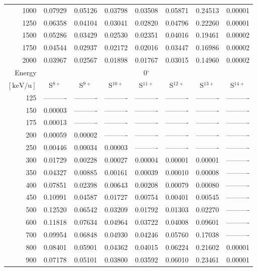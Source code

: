 \begin{table}[ht]
\begin{tabular}{r|c|c|c|c|c|c|c}
     1000 & 0.07929 & 0.05126 & 0.03798 & 0.03508 & 0.05871 & 0.24513 & 0.00001 \\
     1250 & 0.06358 & 0.04104 & 0.03041 & 0.02820 & 0.04796 & 0.22260 & 0.00001 \\
     1500 & 0.05286 & 0.03429 & 0.02530 & 0.02351 & 0.04016 & 0.19461 & 0.00002 \\
     1750 & 0.04544 & 0.02937 & 0.02172 & 0.02016 & 0.03447 & 0.16986 & 0.00002 \\
     2000 & 0.03967 & 0.02567 & 0.01898 & 0.01767 & 0.03015 & 0.14960 & 0.00002 \\ \cline{1-8}
    Energy & \multicolumn{7}{c}{0$^\circ$} \\ \cline{2-8}
    $\mathrm{[keV/u]}$ & S$^{8+}$ & S$^{9+}$ & S$^{10+}$ & S$^{11+}$ & S$^{12+}$ & S$^{13+}$ & S$^{14+}$ \\ \cline{1-8}
      125 & ---------- & ---------- & ---------- & ---------- & ---------- & ---------- & ---------- \\
      150 & 0.00003 & ---------- & ---------- & ---------- & ---------- & ---------- & ---------- \\
      175 & 0.00013 & ---------- & ---------- & ---------- & ---------- & ---------- & ---------- \\
      200 & 0.00059 & 0.00002 & ---------- & ---------- & ---------- & ---------- & ---------- \\
      250 & 0.00446 & 0.00034 & 0.00003 & ---------- & ---------- & ---------- & ---------- \\
      300 & 0.01729 & 0.00228 & 0.00027 & 0.00004 & 0.00001 & 0.00001 & ---------- \\
      350 & 0.04327 & 0.00885 & 0.00161 & 0.00039 & 0.00010 & 0.00008 & ---------- \\
      400 & 0.07851 & 0.02398 & 0.00643 & 0.00208 & 0.00079 & 0.00080 & ---------- \\
      450 & 0.10991 & 0.04587 & 0.01727 & 0.00754 & 0.00401 & 0.00545 & ---------- \\
      500 & 0.12520 & 0.06542 & 0.03209 & 0.01792 & 0.01303 & 0.02270 & ---------- \\
      600 & 0.11818 & 0.07634 & 0.04964 & 0.03722 & 0.04008 & 0.09601 & ---------- \\
      700 & 0.09954 & 0.06848 & 0.04930 & 0.04246 & 0.05760 & 0.17038 & ---------- \\
      800 & 0.08401 & 0.05901 & 0.04362 & 0.04015 & 0.06224 & 0.21602 & 0.00001 \\
      900 & 0.07178 & 0.05101 & 0.03800 & 0.03592 & 0.06010 & 0.23461 & 0.00001 \\

\end{tabular}
\end{table}
